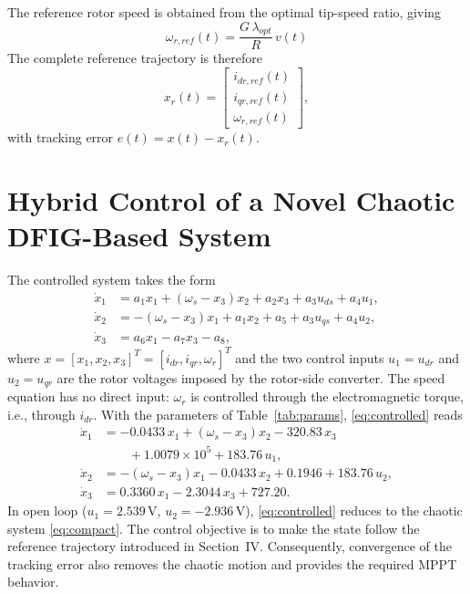 \documentclass[conference]{IEEEtran}
\begin{document}
The reference rotor speed is obtained from the optimal tip-speed ratio, giving
\begin{equation}
\omega_{r,ref}(t) = \frac{G\,\lambda_{opt}}{R}\,v(t)
\label{eq:wref}
\end{equation}
The complete reference trajectory is therefore
\[
x_r(t) = \begin{bmatrix} i_{dr,ref}(t)\\ i_{qr,ref}(t)\\ \omega_{r,ref}(t)\end{bmatrix},
\]
with tracking error $e(t) = x(t) - x_r(t)$.

\section{Hybrid Control of a Novel Chaotic DFIG-Based System}
The controlled system takes the form
\begin{equation}
\begin{aligned}
\dot{x}_1 &= a_1x_1 + \left(\omega_s - x_3\right)x_2 + a_2x_3 + a_3u_{ds} + a_4u_1,\\
\dot{x}_2 &= -\left(\omega_s - x_3\right)x_1 + a_1x_2 + a_5 + a_3u_{qs} + a_4u_2,\\
\dot{x}_3 &= a_6x_1 - a_7x_3 - a_8,
\end{aligned}
\label{eq:controlled}
\end{equation}
where $x = [x_1,x_2,x_3]^T = [i_{dr},i_{qr},\omega_r]^T$ and the two control inputs $u_1 = u_{dr}$ and $u_2 = u_{qr}$ are the rotor voltages imposed by the rotor-side converter. The speed equation has no direct input: $\omega_r$ is controlled through the electromagnetic torque, i.e., through $i_{dr}$. With the parameters of Table~\ref{tab:params}, \eqref{eq:controlled} reads
\begin{align*}
\dot{x}_1 &= -0.0433\,x_1 + \left(\omega_s - x_3\right)x_2 - 320.83\,x_3\\
&\qquad + 1.0079\times10^5 + 183.76\,u_1,\\
\dot{x}_2 &= -\left(\omega_s - x_3\right)x_1 - 0.0433\,x_2 + 0.1946 + 183.76\,u_2,\\
\dot{x}_3 &= 0.3360\,x_1 - 2.3044\,x_3 + 727.20.
\end{align*}
In open loop ($u_1 = 2.539$\,V, $u_2 = -2.936$\,V), \eqref{eq:controlled} reduces to the chaotic system \eqref{eq:compact}. The control objective is to make the state follow the reference trajectory introduced in Section~IV. Consequently, convergence of the tracking error also removes the chaotic motion and provides the required MPPT behavior.
\end{document}
